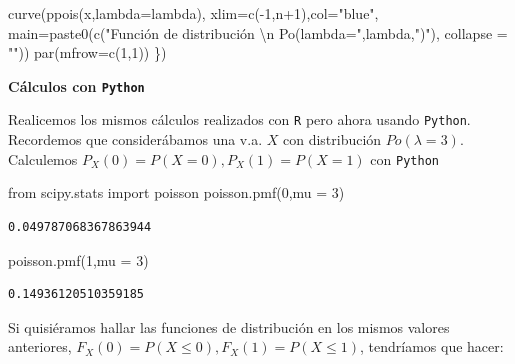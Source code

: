\documentclass[
  letterpaper,
  DIV=11,
  numbers=noendperiod]{scrreprt}
\newenvironment{Shaded}{\begin{snugshade}}{\end{snugshade}}
\newcommand{\AttributeTok}[1]{\textcolor[rgb]{0.40,0.45,0.13}{#1}}
\newcommand{\DecValTok}[1]{\textcolor[rgb]{0.68,0.00,0.00}{#1}}
\newcommand{\FunctionTok}[1]{\textcolor[rgb]{0.28,0.35,0.67}{#1}}
\newcommand{\ImportTok}[1]{\textcolor[rgb]{0.00,0.46,0.62}{#1}}
\newcommand{\NormalTok}[1]{\textcolor[rgb]{0.00,0.23,0.31}{#1}}
\newcommand{\OperatorTok}[1]{\textcolor[rgb]{0.37,0.37,0.37}{#1}}
\newcommand{\SpecialCharTok}[1]{\textcolor[rgb]{0.37,0.37,0.37}{#1}}
\newcommand{\StringTok}[1]{\textcolor[rgb]{0.13,0.47,0.30}{#1}}
\begin{document}
\begin{Shaded}
\begin{Highlighting}[]
  \FunctionTok{curve}\NormalTok{(}\FunctionTok{ppois}\NormalTok{(x,}\AttributeTok{lambda=}\NormalTok{lambda),}
        \AttributeTok{xlim=}\FunctionTok{c}\NormalTok{(}\SpecialCharTok{{-}}\DecValTok{1}\NormalTok{,n}\SpecialCharTok{+}\DecValTok{1}\NormalTok{),}\AttributeTok{col=}\StringTok{"blue"}\NormalTok{,}
        \AttributeTok{main=}\FunctionTok{paste0}\NormalTok{(}\FunctionTok{c}\NormalTok{(}\StringTok{"Función de distribución }\SpecialCharTok{\textbackslash{}n}\StringTok{ Po(lambda="}\NormalTok{,lambda,}\StringTok{")"}\NormalTok{),}
                     \AttributeTok{collapse =} \StringTok{""}\NormalTok{))}
  \FunctionTok{par}\NormalTok{(}\AttributeTok{mfrow=}\FunctionTok{c}\NormalTok{(}\DecValTok{1}\NormalTok{,}\DecValTok{1}\NormalTok{))}
\NormalTok{\})}
\end{Highlighting}
\end{Shaded}

\textbf{Cálculos con \texttt{Python}}

Realicemos los mismos cálculos realizados con \texttt{R} pero ahora
usando \texttt{Python}. Recordemos que considerábamos una v.a. \(X\) con
distribución \(Po(\lambda=3)\). Calculemos
\(P_X(0)=P(X=0), P_X(1)=P(X=1)\) con \texttt{Python}

\begin{Shaded}
\begin{Highlighting}[]
\ImportTok{from}\NormalTok{ scipy.stats }\ImportTok{import}\NormalTok{ poisson}
\NormalTok{poisson.pmf(}\DecValTok{0}\NormalTok{,mu }\OperatorTok{=} \DecValTok{3}\NormalTok{)}
\end{Highlighting}
\end{Shaded}

\begin{verbatim}
0.049787068367863944
\end{verbatim}

\begin{Shaded}
\begin{Highlighting}[]
\NormalTok{poisson.pmf(}\DecValTok{1}\NormalTok{,mu }\OperatorTok{=} \DecValTok{3}\NormalTok{)}
\end{Highlighting}
\end{Shaded}

\begin{verbatim}
0.14936120510359185
\end{verbatim}

Si quisiéramos hallar las funciones de distribución en los mismos
valores anteriores, \(F_X(0)=P(X\leq 0), F_X(1)=P(X\leq 1)\), tendríamos
que hacer:
\end{document}
